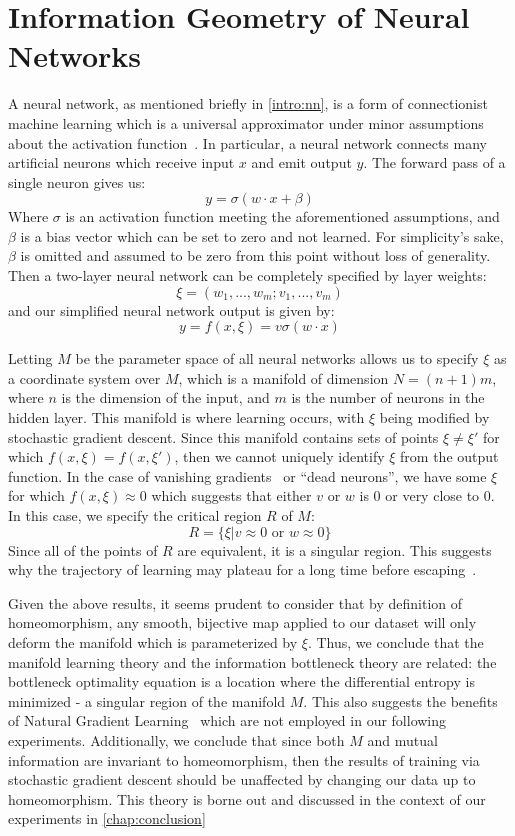 \section{Information Geometry of Neural Networks}
A neural network, as mentioned briefly in \ref{intro:nn}, is a form of connectionist machine learning which is a universal approximator under minor assumptions about the activation function~\cite{goodfellow2016deep}.
In particular, a neural network connects many artificial neurons which receive input $x$ and emit output $y$. 
The forward pass of a single neuron gives us:
$$y = \sigma(w \cdot x + \beta)$$
Where $\sigma$ is an activation function meeting the aforementioned assumptions, and $\beta$ is a bias vector which can be set to zero and not learned.
For simplicity's sake, $\beta$ is omitted and assumed to be zero from this point without loss of generality.
Then a two-layer neural network can be completely specified by layer weights:
$$\xi = (w_1, ..., w_m; v_1, ..., v_m)$$
and our simplified neural network output is given by:
$$y = f(x, \xi) = v\sigma(w \cdot x)$$

Letting $M$ be the parameter space of all neural networks allows us to specify $\xi$ as a coordinate system over $M$, which is a manifold of dimension $N=(n+1)m$, where $n$ is the dimension of the input, and $m$ is the number of neurons in the hidden layer.
This manifold is where learning occurs, with $\xi$ being modified by stochastic gradient descent. 
Since this manifold contains sets of points $\xi \neq \xi'$ for which $f(x, \xi) = f(x, \xi')$, then we cannot uniquely identify $\xi$ from the output function. 
In the case of vanishing gradients~\cite{hochreiter2001gradient} or ``dead neurons'', we have some $\xi$ for which $f(x, \xi) \approx 0$ which suggests that either $v$ or $w$ is 0 or very close to 0.
In this case, we specify the critical region $R$ of $M$:
$$R = \{\xi | v \approx 0 \text{ or } w \approx 0\}$$
Since all of the points of $R$ are equivalent, it is a singular region.
This suggests why the trajectory of learning may plateau for a long time before escaping~\cite{amari2006singularities}.

Given the above results, it seems prudent to consider that by definition of homeomorphism, any smooth, bijective map applied to our dataset will only deform the manifold which is parameterized by $\xi$. 
Thus, we conclude that the manifold learning theory and the information bottleneck theory are related: the bottleneck optimality equation is a location where the differential entropy is minimized - a singular region of the manifold $M$.
This also suggests the benefits of Natural Gradient Learning~\cite{cousseau2008dynamics} which are not employed in our following experiments.
Additionally, we conclude that since both $M$ and mutual information are invariant to homeomorphism, then the results of training via stochastic gradient descent should be unaffected by changing our data up to homeomorphism.
This theory is borne out and discussed in the context of our experiments in \ref{chap:conclusion}
